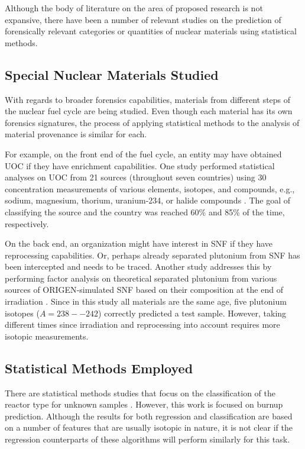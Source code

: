 Although the body of literature on the area of proposed research is not
expansive, there have been a number of relevant studies on the prediction of
forensically relevant categories or quantities of nuclear materials using
statistical methods. 

\subsection{Special Nuclear Materials Studied}

With regards to broader forensics capabilities, materials from different steps
of the nuclear fuel cycle are being studied.  Even though each material has
its own forensics signatures, the process of applying statistical methods to
the analysis of material provenance is similar for each. 

For example, on the front end of the fuel cycle, an entity may have obtained
\gls{UOC} if they have enrichment capabilities.  One study performed
statistical analyses on \gls{UOC} from 21 sources (throughout seven countries)
using 30 concentration measurements of various elements, isotopes, and
compounds, e.g., sodium, magnesium, thorium, uranium-234, or halide compounds
\cite{robel_2009}.  The goal of classifying the source and the country was
reached 60\% and 85\% of the time, respectively.  

On the back end, an organization might have interest in \gls{SNF} if they have
reprocessing capabilities.  Or, perhaps already separated plutonium from
\gls{SNF} has been intercepted and needs to be traced. Another study addresses
this by performing factor analysis on theoretical separated plutonium from
various sources of \gls{ORIGEN}-simulated \gls{SNF} based on their composition
at the end of irradiation \cite{nicolaou_pu}.  Since in this study all
materials are the same age, five plutonium isotopes ($A = 238--242$) correctly
predicted a test sample. However, taking different times since irradiation and
reprocessing into account requires more isotopic measurements. 

\subsection{Statistical Methods Employed}

There are statistical methods studies that focus on the classification of the
reactor type for unknown samples \cite{robel_2009, nicolaou_pu, jones_snf_2014,
nicolaou_2009}.  However, this work is focused on burnup prediction.  Although
the results for both regression and classification are based on a number of
features that are usually isotopic in nature, it is not clear if the regression
counterparts of these algorithms will perform similarly for this task. 

